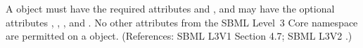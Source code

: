 A \Parameter object must have the required attributes  and
, and may have the optional attributes ,
, ,  and .  No other
attributes from the SBML Level~3 Core namespace are permitted on a
\Parameter object.  (References: SBML L3V1 Section 4.7; SBML L3V2 .)
